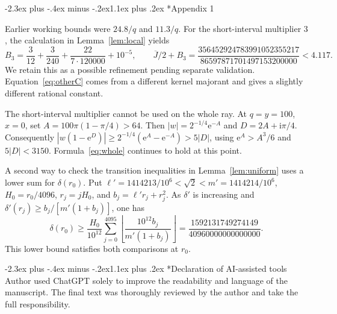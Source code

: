 \documentclass[11pt,a4paper]{article}
\makeatletter
\newcommand{\ii}{\mathrm i}
\newcommand{\e}{\mathrm e}
\renewcommand\section{\@startsection{section}{1}{\z@}
  {-2.3ex plus -.4ex minus -.2ex}{1.1ex plus .2ex}
  {\normalfont\large\bfseries\centering}}
\makeatother
\begin{document}
\section*{Appendix 1}
\enlargethispage{\baselineskip}

Earlier working bounds were $24.8/q$ and $11.3/q$. For the short-interval
multiplier $3$, the calculation in Lemma~\ref{lem:local} yields
\[
 B_3=\frac3{12}+\frac3{240}+\frac{22}{7\cdot120000}+10^{-5},
 \qquad
 \overline J/2+B_3=\frac{356452924783991052355217}{86597871701497153200000}<4.117 .
\]
We retain this as a possible refinement pending separate validation. Equation~\eqref{eq:otherC} comes from a different kernel
majorant and gives a slightly different rational constant.

The short-interval multiplier cannot be used on the whole ray. At
$q=y=100$, $x=0$, set $A=100\pi(1-\pi/4)>64$. Then
$|w|=2^{-1/4}\e^{-A}$ and $D=2A+\ii\pi/4$. Consequently
$|w(1-\e^D)|\ge 2^{-1/4}(\e^A-\e^{-A})>5|D|$,
using $\e^A>A^3/6$ and $5|D|<3150$. Formula~\eqref{eq:whole}
continues to hold at this point.

A second way to check the transition inequalities in
Lemma~\ref{lem:uniform} uses a lower sum for $\delta(r_0)$.
Put $\ell'=1414213/10^6<\sqrt2<m'=1414214/10^6$,
$H_0=r_0/4096$, $r_j=jH_0$, and $b_j=\ell' r_j+r_j^2$.
As $\delta'$ is increasing and
$\delta'(r_j)\ge b_j/[m'(1+b_j)]$, one has
\[
 \delta(r_0)\ge \frac{H_0}{10^{12}}
 \sum_{j=0}^{4095}\left\lfloor\frac{10^{12} b_j}{m'(1+b_j)}\right\rfloor
 =\frac{1592131749274149}{40960000000000000}.
\]
This lower bound satisfies both comparisons at $r_0$.

\section*{Declaration of AI-assisted tools}
Author used ChatGPT solely to improve the readability and language of the manuscript. The final text was thoroughly reviewed by the author and take the full responsibility.
\end{document}
